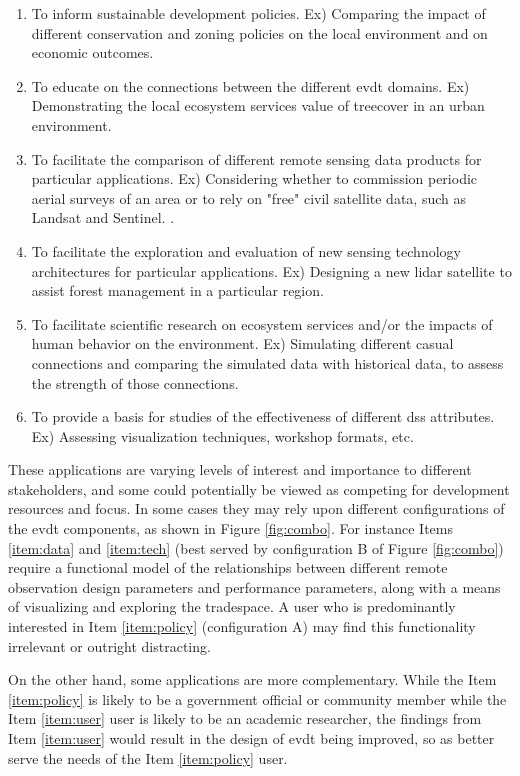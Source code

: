 \begin{enumerate} \setlength{\itemsep}{0pt} \setlength{\parskip}{0pt}
    \item To inform sustainable development policies. Ex) Comparing the impact of different conservation and zoning policies on the local environment and on economic outcomes.  \label{item:policy}
    \item To educate on the connections between the different \ac{evdt} domains. Ex) Demonstrating the local ecosystem services value of treecover in an urban environment.
	\item To facilitate the comparison of different remote sensing data products for particular applications. Ex) Considering whether to commission periodic aerial surveys of an area or to rely on "free" civil satellite data, such as Landsat and Sentinel. \label{item:data}.
    \item To facilitate the exploration and evaluation of new sensing technology architectures for particular applications. Ex) Designing a new \ac{lidar} satellite to assist forest management in a particular region. \label{item:tech}
    \item To facilitate scientific research on ecosystem services and/or the impacts of human behavior on the environment. Ex) Simulating different casual connections and comparing the simulated data with historical data, to assess the strength of those connections.
    \item To provide a basis for studies of the effectiveness of different \ac{dss} attributes. Ex) Assessing visualization techniques, workshop formats, etc. \label{item:user}
\end{enumerate}

These applications are varying levels of interest and importance to different stakeholders, and some could potentially be viewed as competing for development resources and focus. In some cases they may rely upon different configurations of the \ac{evdt} components, as shown in Figure \ref{fig:combo}. For instance Items \ref{item:data} and \ref{item:tech} (best served by configuration B of Figure \ref{fig:combo}) require a functional model of the relationships between different remote observation design parameters and performance parameters, along with a means of visualizing and exploring the tradespace. A user who is predominantly interested in Item \ref{item:policy} (configuration A) may find this functionality irrelevant or outright distracting.

On the other hand, some applications are more complementary. While the Item \ref{item:policy} is likely to be a government official or community member while the Item \ref{item:user} user is likely to be an academic researcher, the findings from Item \ref{item:user} would result in the design of \ac{evdt} being improved, so as better serve the needs of the Item \ref{item:policy} user.

